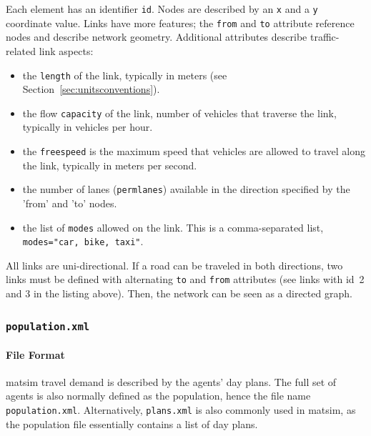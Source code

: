 Each element has an identifier \lstinline|id|. Nodes are described by an \lstinline|x| and a \lstinline|y| coordinate value. Links have more features; the \lstinline|from| and \lstinline|to| attribute reference nodes and describe network geometry. Additional attributes describe traffic-related link aspects:
\begin{itemize}\styleItemize
    \item the \lstinline|length| of the link, typically in meters (see Section~\ref{sec:unitsconventions}).
    \item the flow \lstinline|capacity| of the link, \ie number of vehicles that traverse the link, typically in vehicles per hour.
    \item the \lstinline|freespeed| is the maximum speed that vehicles are allowed to travel along the link, typically in meters per second.
    \item the number of lanes (\lstinline|permlanes|) available in the direction specified by the 'from' and 'to' nodes.
    \item the list of \lstinline|modes| allowed on the link. This is a comma-separated list, \eg \lstinline|modes="car, bike, taxi"|.
\end{itemize}
All links are uni-directional. If a road can be traveled in both directions, two links must be defined with alternating \lstinline|to| and \lstinline|from| attributes (see links with id~2 and 3 in the listing above). Then, the network can be seen as a directed graph. 

\subsubsection{\lstinline|population.xml|}
\label{sec:lgstarted-population-file}
\paragraph{File Format}

 \gls{matsim} travel demand is described by the agents' day plans. The full set of agents is also normally defined as the population, hence the file name \lstinline|population.xml|. Alternatively, \lstinline|plans.xml| is also commonly used in \gls{matsim}, as the population file essentially contains a list of day plans.

